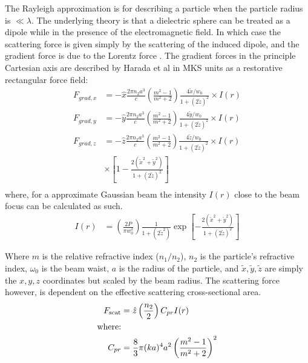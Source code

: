 The Rayleigh approximation is for describing a particle when 
the particle radius is $\ll \lambda$. The underlying theory 
is that a dielectric sphere can be treated as a dipole while 
in the presence of the electromagnetic field. In which case 
the scattering force is given simply by the scattering of 
the induced dipole, and the gradient force is due to the 
Lorentz force \cite{Gordon1973}. The gradient forces in the 
principle Cartesian axis are described by Harada et al \cite{YasuhiroHarada1996} in MKS units as a restorative 
rectangular force field:
\begin{align}
  F_{grad,x}
  &=-\hat{x} \frac{2\pi n_2 a^3}{c}
    \left(\frac{m^2-1}{m^2+2}\right) \frac{4\tilde{x}/w_0}{1+(2\tilde{z})^2} \times I(r)
  \label{eq:Rayleigh_start}\\
  F_{grad,y}
  &=-\hat{y} \frac{2\pi n_2 a^3}{c}
    \left(\frac{m^2-1}{m^2+2}\right) \frac{4\tilde{y}/w_0}{1+(2\tilde{z})^2} \times I(r)
  \\
  F_{grad,z}
  &=-\hat{z} \frac{2\pi n_2 a^3}{c}
    \left(\frac{m^2-1}{m^2+2}\right) \frac{4\tilde{z}/w_0}{1+(2\tilde{z})^2}
    \nonumber \times I(r)
  \\ 
  & \times \left[1-\frac{2(\tilde{x}^2+\tilde{y}^2)}{1+(2\tilde{z})^2} \right]
  \\
  \label{eq:Rayleigh_end}
\end{align}
where, for a approximate Gaussian beam the intensity $I(r)$ 
close to the beam focus can be calculated as such.
\begin{align}
  \nonumber
	I(r) &= \left(\frac{2P}{\pi w_0^2}\right) \frac{1}{1+(2\tilde{z}^2)} 
	\exp \left[ - \frac{2(\tilde{x}^2+\tilde{y}^2)}{1+(2\tilde{z})^2} \right]
\end{align}

\noindent
Where $m$ is the relative refractive index ($n_1/n_2$), $n_2$ is 
the particle's refractive index, $\omega_0$ is the beam waist, 
$a$ is the radius of the particle, and $\tilde{x}, \tilde{y}, 
\tilde{z}$ are simply the $x, y, z$ coordinates but scaled by the 
beam radius. The scattering force however, is dependent on the 
effective scattering cross-sectional area. 
\begin{align}
  F_{\rm scat}
  &= \hat{z} \left(\frac{n_2}{2}\right) C_{pr} I(r) \\
  \text{where:} \nonumber \\
  C_{pr} &= \frac{8}{3} \pi (ka)^4 a^2 \left(\frac{m^2-1}{m^2+2}\right)^2
\end{align}

